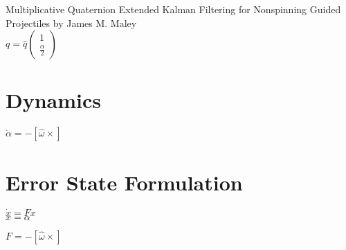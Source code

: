 \documentclass{article}
\begin{document}
Multiplicative Quaternion Extended Kalman Filtering for Nonspinning Guided Projectiles by James M. Maley \\

\noindent $q = \hat{q}\begin{pmatrix} 1 \\ \frac{\alpha}{2} \end{pmatrix}$

\section{Dynamics}

$\dot{\alpha}=-[\hat{\omega}\times]$

\section{Error State Formulation}

$\dot{x} = Fx$ \\

\noindent $x = \alpha$

\noindent $F=-[\hat{\omega}\times]$
\end{document}
